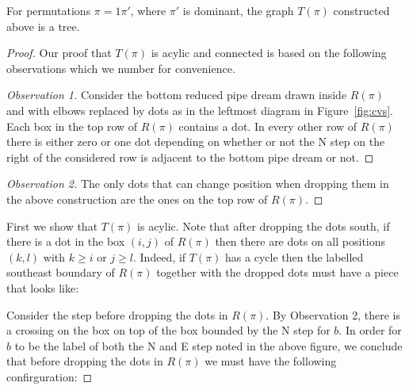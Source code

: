 \documentclass[ALCO,ThmDefs]{cedram}
\numberwithin{equation}{section}
\newcommand*\+{\smash{\lower2pt\hbox{\rlap{\vrule height14pt}}\raise2pt\hbox{\rlap{\hskip-3pt \vrule height.4pt depth0pt width14.7pt}}}}
\begin{document}
\begin{lemm}
For permutations $\pi=1\pi'$, where $\pi'$ is dominant, the graph $T(\pi)$ constructed above is a tree.
\end{lemm}

\begin{proof}
Our proof that $T(\pi)$ is acylic and connected is based on the following observations which we number for convenience.

\begin{proof}[Observation 1]
Consider the bottom reduced pipe dream drawn inside $R(\pi)$ and with elbows replaced by dots as in the leftmost diagram in Figure~\ref{fig:cvs}. Each box in the top row of $R(\pi)$ contains a dot. In every other row of $R(\pi)$ there is either zero or one dot depending on whether or not the N step on the right of the considered row is adjacent to the bottom pipe dream or not.
\let\qed\relax
\end{proof}

\begin{proof}[Observation 2]
The only dots that can change position when dropping them in the above construction are the ones on the top row of $R(\pi)$.
\let\qed\relax
\end{proof}

First we show that $T(\pi)$ is acylic. Note that after dropping the dots south, if there is a dot in the box $(i,j)$ of $R(\pi)$ then there are dots on all positions $(k,l)$ with $k\ge i$ or $j\ge l$. Indeed, if $T(\pi)$ has a cycle then the labelled southeast boundary of $R(\pi)$ together with the dropped dots must have a piece that looks like:
\begin{center}
\end{center}

Consider the step before dropping the dots in $R(\pi)$. By {Observation 2}, there is a crossing on the box on top of the box bounded by the N step for $b$. In order for $b$ to be the label of both the N and E step noted in the above figure, we conclude that before dropping the dots in $R(\pi)$ we must have the following confirguration:


\end{proof}
\end{document}
